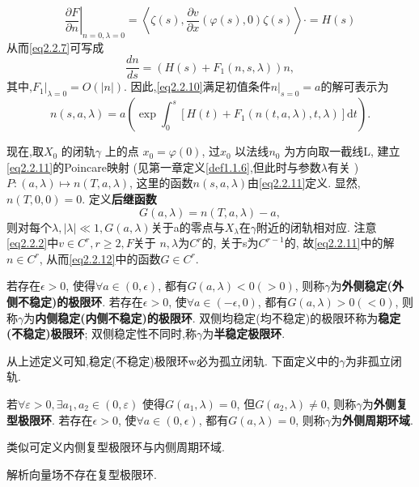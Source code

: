 \begin{equation}
  \label{eq2.2.9}
\left.\frac{\partial F}{\partial n}\right|_{n=0, \lambda=0}=\left\langle\zeta(s), \frac{\partial v}{\partial x}(\varphi(s), 0) \zeta(s)\right\rangle \cdot= H(s)
\end{equation}
从而\eqref{eq2.2.7}可写成
\begin{equation}
  \label{eq2.2.10}
  \frac{d n}{d s}=\left(H(s)+F_{1}(n, s, \lambda)\right) n,
\end{equation}
其中,\(\left.F_{1}\right|_{\lambda=0}=O(|n|)\).
因此,\eqref{eq2.2.10}满足初值条件\(\left.n\right|_{s=0}=a\)的解可表示为
\begin{equation}
  \label{eq2.2.11}
  n(s, a, \lambda)=a\left(\exp \int_{0}^{s}\left[H(t)+F_{1}(n(t, a, \lambda), t, \lambda)\right] \mathrm{d} t\right).
\end{equation}
\par
现在,取\(X_{0}\) 的闭轨\(\gamma\) 上的点
\( x_{0}=\varphi(0)\),
过\(x_{0}\) 以法线\(n_{0}\) 为方向取一截线L,
建立\ref{eq2.2.11}的Poincare映射
(见第一章定义\ref{def1.1.6},但此时与参数\(\lambda\)有关 )
\( P:(a, \lambda) \mapsto n(T, a, \lambda)\),
这里的函数\(n(s,a,\lambda)\)由\ref{eq2.2.11}定义.
显然,\( n(T, 0,0)=0 \).
定义\textbf{后继函数}
\begin{equation}
  \label{eq2.2.12}
G(a, \lambda)=n(T, a, \lambda)-a,
\end{equation}
则对每个\(\lambda,|\lambda| \ll 1, G(a, \lambda)\)关于a的零点与\(X_{\lambda}\)在\(\gamma\)附近的闭轨相对应.
注意\eqref{eq2.2.2}中\(v \in C^{r}, r \geqslant 2, F\)关于
\(n,\lambda\)为\(C^{r}\)的,
关于s为\(C^{r-1}\)的,
故\eqref{eq2.2.11}中的解\(n \in C^{r}\),
从而\eqref{eq2.2.12}中的函数\(G \in C^{r}\).
\begin{defination}
  \label{def2.2.1}
  若存在\(\epsilon>0\),
  使得\( \forall a \in (0,\epsilon)\),
  都有\( G (a,\lambda)<0(>0)\),
  则称\(\gamma\)为\textbf{外侧稳定(外侧不稳定)的极限环}.
  若存在\(\epsilon>0\),
  使\(\forall a \in (-\epsilon ,0)\),
  都有\(G(a, \lambda)>0(<0)\),
  则称\(\gamma\)为\textbf{内侧稳定(内侧不稳定)的极限环}.
  双侧均稳定(均不稳定)的极限环称为\textbf{稳定(不稳定)极限环};
  双侧稳定性不同时,称\(\gamma\)为\textbf{半稳定极限环}.
\end{defination}
从上述定义可知,稳定(不稳定)极限环w必为孤立闭轨.
下面定义中的$\gamma$为非孤立闭轨.

\begin{defination}
  \label{def2.2.2}
  若$\forall \varepsilon>0, \exists a_{1}, a_{2} \in(0, \varepsilon)$
  使得$G(a_{1},\lambda)=0$,
  但$G(a_{2},\lambda)\neq 0$,
  则称$\gamma$为\textbf{外侧复型极限环}.
  若存在$\epsilon>0$,
  使$\forall a \in (0,\epsilon)$,
  都有$G(a,\lambda)=0$,
  则称$\gamma$为\textbf{外侧周期环域}.
\end{defination}
类似可定义内侧复型极限环与内侧周期环域.
\begin{theorem}
  \label{thm2.2.3}
  解析向量场不存在复型极限环.
\end{theorem}

